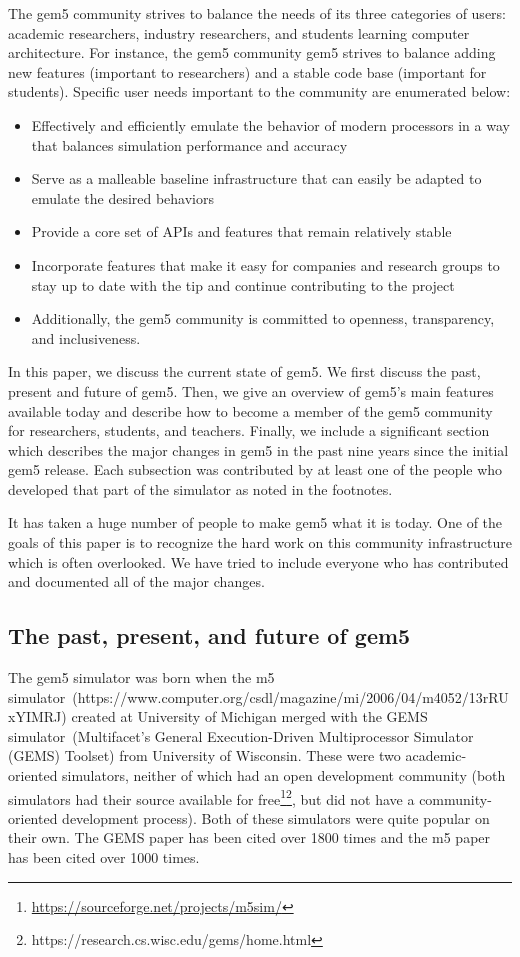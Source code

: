 The gem5 community strives to balance the needs of its three categories of users: academic researchers, industry researchers, and students learning computer architecture.
For instance, the gem5 community gem5 strives to balance adding new features (important to researchers) and a stable code base (important for students).
Specific user needs important to the community are enumerated below:
\begin{itemize}
    \item Effectively and efficiently emulate the behavior of modern processors in a way that balances simulation performance and accuracy
    \item Serve as a malleable baseline infrastructure that can easily be adapted to emulate the desired behaviors
    \item Provide a core set of APIs and features that remain relatively stable
    \item Incorporate features that make it easy for companies and research groups to stay up to date with the tip and continue contributing to the project
    \item Additionally, the gem5 community is committed to openness, transparency, and inclusiveness.
\end{itemize}

In this paper, we discuss the current state of gem5.
We first discuss the past, present and future of gem5.
Then, we give an overview of gem5's main features available today and describe how to become a member of the gem5 community for researchers, students, and teachers.
Finally, we include a significant section which describes the major changes in gem5 in the past nine years since the initial gem5 release.
Each subsection was contributed by at least one of the people who developed that part of the simulator as noted in the footnotes.

It has taken a huge number of people to make gem5 what it is today.
One of the goals of this paper is to recognize the hard work on this community infrastructure which is often overlooked.
We have tried to include everyone who has contributed and documented all of the major changes.

\subsection{The past, present, and future of gem5}

The gem5 simulator was born when the m5 simulator~\cite{}(https://www.computer.org/csdl/magazine/mi/2006/04/m4052/13rRUxYIMRJ) created at University of Michigan merged with the GEMS simulator~\cite{}(Multifacet's General Execution-Driven Multiprocessor Simulator (GEMS) Toolset) from University of Wisconsin.
These were two academic-oriented simulators, neither of which had an open development community (both simulators had their source available for free\footnote{\url{https://sourceforge.net/projects/m5sim/}}\footnote{https://research.cs.wisc.edu/gems/home.html}, but did not have a community-oriented development process).
Both of these simulators were quite popular on their own.
The GEMS paper has been cited over 1800 times and the m5 paper has been cited over 1000 times.

